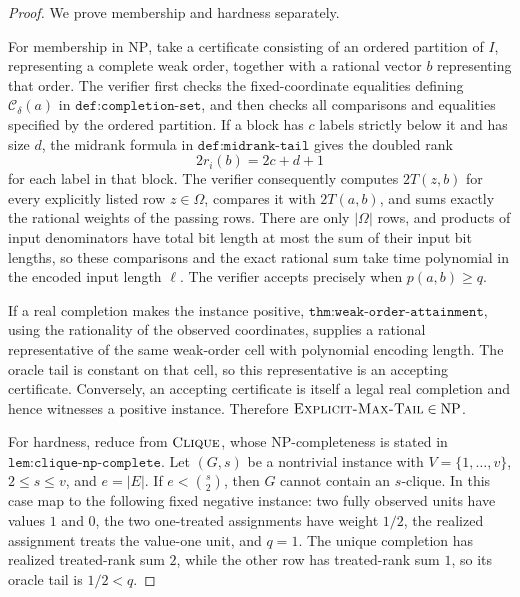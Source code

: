 \documentclass{article}
\begin{document}
\begin{proof}
We prove membership and hardness separately.

For membership in \(\mathrm{NP}\), take a certificate consisting of an ordered partition of \(I\), representing a complete weak order, together with a rational vector \(b\) representing that order.  The verifier first checks the fixed-coordinate equalities defining \(\mathcal C_\delta(a)\) in \(\texttt{def:completion-set}\), and then checks all comparisons and equalities specified by the ordered partition.  If a block has \(c\) labels strictly below it and has size \(d\), the midrank formula in \(\texttt{def:midrank-tail}\) gives the doubled rank
\[
 2r_i(b)=2c+d+1
\]
for each label in that block.  The verifier consequently computes \(2T(z,b)\) for every explicitly listed row \(z\in\Omega\), compares it with \(2T(a,b)\), and sums exactly the rational weights of the passing rows.  There are only \(|\Omega|\) rows, and products of input denominators have total bit length at most the sum of their input bit lengths, so these comparisons and the exact rational sum take time polynomial in the encoded input length \(\ell\).  The verifier accepts precisely when \(p(a,b)\ge q\).

If a real completion makes the instance positive, \(\texttt{thm:weak-order-attainment}\), using the rationality of the observed coordinates, supplies a rational representative of the same weak-order cell with polynomial encoding length.  The oracle tail is constant on that cell, so this representative is an accepting certificate.  Conversely, an accepting certificate is itself a legal real completion and hence witnesses a positive instance.  Therefore \(\textsc{Explicit-Max-Tail}\in\mathrm{NP}\).

For hardness, reduce from \(\textsc{Clique}\), whose NP-completeness is stated in \(\texttt{lem:clique-np-complete}\).  Let \((G,s)\) be a nontrivial instance with \(V=\{1,\ldots,v\}\), \(2\le s\le v\), and \(e=|E|\).  If \(e<\binom{s}{2}\), then \(G\) cannot contain an \(s\)-clique.  In this case map to the following fixed negative instance: two fully observed units have values \(1\) and \(0\), the two one-treated assignments have weight \(1/2\), the realized assignment treats the value-one unit, and \(q=1\).  The unique completion has realized treated-rank sum \(2\), while the other row has treated-rank sum \(1\), so its oracle tail is \(1/2<q\).


\end{proof}
\end{document}
